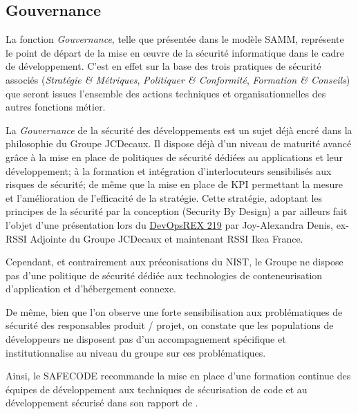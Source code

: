 \subsection{Gouvernance}

La fonction \emph{Gouvernance}, telle que présentée dans le modèle \ac{SAMM}, représente le point de départ de la 
mise en œuvre de la sécurité informatique dans le cadre de développement. C'est en effet sur la base des 
trois pratiques de sécurité associés (\emph{Stratégie \& Métriques}, \emph{Politiquer \& Conformité}, 
\emph{Formation \& Conseils}) que seront issues l'ensemble des actions techniques et organisationnelles des autres
fonctions métier.

La \emph{Gouvernance} de la sécurité des développements est un sujet déjà encré dans la philosophie du Groupe JCDecaux.
Il dispose déjà d'un niveau de maturité avancé grâce à la mise en place de politiques de sécurité dédiées au 
applications et leur développement; à la formation et intégration d'interlocuteurs sensibilisés aux risques de sécurité;
de même que la mise en place de \ac{KPI} permettant la mesure et l'amélioration de l'efficacité de la stratégie.
\newline Cette stratégie, adoptant les principes de la sécurité par la conception (Security By Design) a par ailleurs 
fait  l'objet d'une présentation\autocite{devopsrex_denis_2019} lors du \href{https://2019.devopsrex.fr/}{DevOpsREX 219} 
par Joy-Alexandra Denis, ex-RSSI Adjointe du Groupe JCDecaux et maintenant RSSI Ikea France.

Cependant, et contrairement aux préconisations du \ac{NIST}\autocite*{app_cont_sec_nist_2017}, le Groupe ne dispose pas
d'une politique de sécurité dédiée aux technologies de conteneurisation d'application et d'hébergement connexe. 

De même, bien que l'on observe une forte sensibilisation aux problématiques de sécurité des responsables produit / 
projet, on constate que les populations de développeurs ne disposent pas d'un accompagnement spécifique et
institutionnalise au niveau du groupe sur ces \linebreak problématiques.

Ainsi, le \ac{SAFECODE} recommande la mise en place d'une formation continue des équipes de développement aux techniques
de sécurisation de code et au développement sécurisé dans son rapport  de 
.

\newpage

